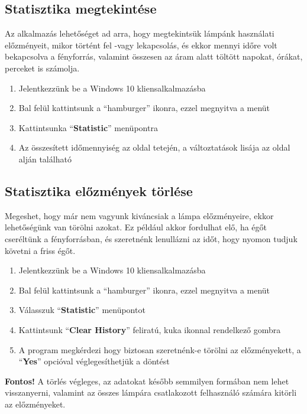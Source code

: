 \documentclass[a4paper,12pt]{report}
\begin{document}
\subsection{Statisztika megtekintése}
    Az alkalmazás lehetőséget ad arra, hogy megtekintsük lámpánk használati előzményeit, mikor történt fel -vagy lekapcsolás,
    és ekkor mennyi időre volt bekapcsolva a fényforrás, valamint összesen az áram alatt töltött napokat, órákat, perceket is
    számolja.

\begin{enumerate}
    \item Jelentkezzünk be a Windows 10 kliensalkalmazásba
    \item Bal felül kattintsunk a ``hamburger'' ikonra, ezzel megnyitva a menüt
    \item Kattintsunka ``\textbf{Statistic}'' menüpontra
    \item Az összesített időmennyiség az oldal tetején, a változtatások lisája az oldal alján található
\end{enumerate}

\subsection{Statisztika előzmények törlése}
    Megeshet, hogy már nem vagyunk kiváncsiak a lámpa előzményeire, ekkor lehetőségünk van törölni azokat. Ez például akkor
    fordulhat elő, ha égőt cseréltünk a fényforrásban, és szeretnénk lenullázni az időt, hogy nyomon tudjuk követni a friss
    égőt.

\begin{enumerate}
    \item Jelentkezzünk be a Windows 10 kliensalkalmazásba
    \item Bal felül kattintsunk a ``hamburger'' ikonra, ezzel megnyitva a menüt
    \item Válasszuk ``\textbf{Statistic}'' menüpontot
    \item Kattintsunk ``\textbf{Clear History}'' feliratú, kuka ikonnal rendelkező gombra
    \item A program megkérdezi hogy biztosan szeretnénk-e törölni az előzményekett, a ``\textbf{Yes}'' opcióval véglegesíthetjük
    a döntést
\end{enumerate}

    \textbf{Fontos!} A törlés végleges, az adatokat később semmilyen formában nem lehet visszanyerni, valamint az összes lámpára
    csatlakozott felhasználó számára kitörli az előzményeket.
\end{document}
